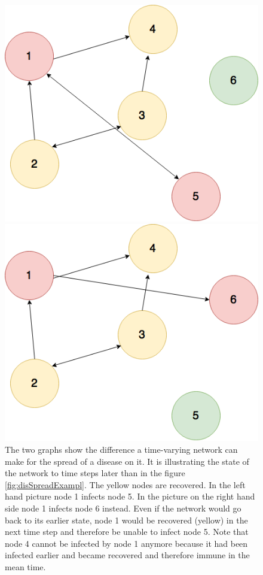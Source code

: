 \begin{figure}[htbp]
\begin{minipage}{0.5\textwidth}
\centering
\noindent\includegraphics[width=0.9\linewidth,height=\textheight,
keepaspectratio]{Graph4.png} 
\end{minipage}
\begin{minipage}{0.5\textwidth}
\centering
\noindent\includegraphics[width=0.9\linewidth,height=\textheight,
keepaspectratio]{Graph5.png} 
\end{minipage}
\caption[Disease Spread On A Time Dependant Network]{The two graphs show the difference a time-varying network can make for the spread of a disease on it. It is illustrating the state of the network to time steps later than in the figure \ref{fig:disSpreadExampl}. The yellow nodes are recovered. In the left hand picture node 1 infects node 5. In the picture on the right hand side node 1 infects node 6 instead. Even if the network would go back to its earlier state, node 1 would be recovered (yellow) in the next time step and therefore be unable to infect node 5. Note that node 4 cannot be infected by node 1 anymore because it had been infected earlier and became recovered and therefore immune in the mean time.}
\label{fig:timeDependantNetworkSpread}
\end{figure}

